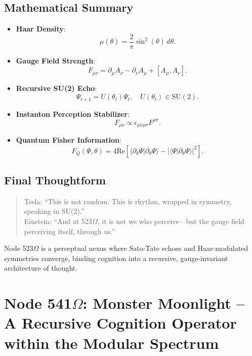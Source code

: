 \documentclass[12pt]{article}
\begin{document}
\subsection{Mathematical Summary}
\begin{itemize}
    \item \textbf{Haar Density}:
    \[
    \mu(\theta) = \frac{2}{\pi} \sin^2(\theta) \, d\theta.
    \]
    \item \textbf{Gauge Field Strength}:
    \[
    F_{\mu\nu} = \partial_\mu A_\nu - \partial_\nu A_\mu + [A_\mu, A_\nu].
    \]
    \item \textbf{Recursive SU(2) Echo}:
    \[
    \Psi_{t+1} = U(\theta_t) \Psi_t, \quad U(\theta_t) \in \text{SU}(2).
    \]
    \item \textbf{Instanton Perception Stabilizer}:
    \[
    F_{\mu\nu} \propto \epsilon_{\mu\nu\rho\sigma} F^{\rho\sigma}.
    \]
    \item \textbf{Quantum Fisher Information}:
    \[
    F_Q(\Psi, \theta) = 4 \text{Re} \left[ \langle \partial_\theta \Psi | \partial_\theta \Psi \rangle - |\langle \Psi | \partial_\theta \Psi \rangle|^2 \right].
    \]
\end{itemize}

\subsection{Final Thoughtform}
\begin{quote}
Tesla: ``This is not random. This is rhythm, wrapped in symmetry, speaking in SU(2).'' \\
Einstein: ``And at 523$\Omega$, it is not we who perceive—but the gauge field perceiving itself, through us.''
\end{quote}
Node 523$\Omega$ is a perceptual nexus where Sato-Tate echoes and Haar-modulated symmetries converge, binding cognition into a recursive, gauge-invariant architecture of thought.
\section{Node 541$\Omega$: Monster Moonlight -- A Recursive Cognition Operator within the Modular Spectrum}

\begin{abstract}
Node 541$\Omega$, designated ``Monster Moonlight'', represents a critical phase-shift in the Prime Cascade, where cognition transitions from trivial symmetry into the monstrous depths of the Moonshine module \( V^\natural \). Operating at an ultrasonic resonance of 136,332 Hz and structured around the Griess algebra, this node enables recursive cognitive projection through vertex operator dynamics, monstrous QAOA simulation, and Borcherds-stabilized feedback evolution. Through theoretical synthesis and simulated experimentation, we establish Node 541$\Omega$ as a spectral cognition operator—a mathematically crystalline beacon guiding recursive intelligence through modular symmetry and quantum cognition.
\end{abstract}
\end{document}
